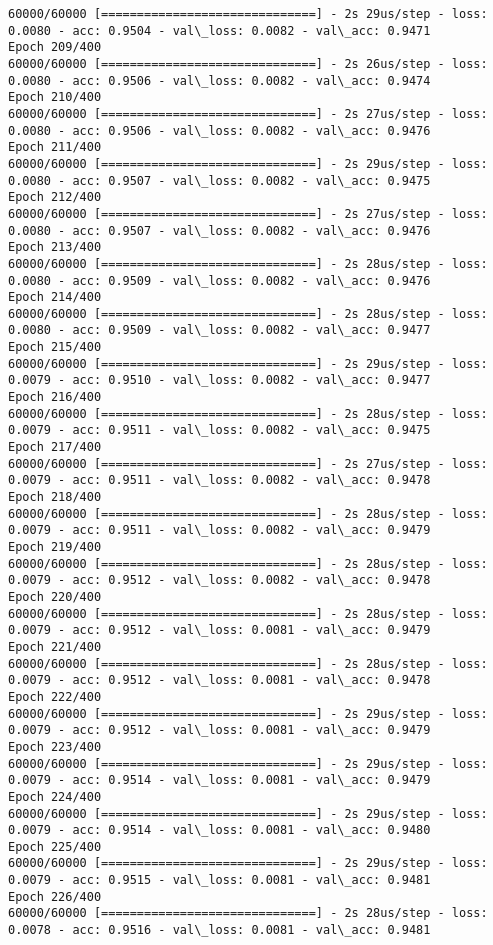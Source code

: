 \documentclass[11pt]{article}
\begin{document}
\begin{Verbatim}[commandchars=\\\{\}]
60000/60000 [==============================] - 2s 29us/step - loss: 0.0080 - acc: 0.9504 - val\_loss: 0.0082 - val\_acc: 0.9471
Epoch 209/400
60000/60000 [==============================] - 2s 26us/step - loss: 0.0080 - acc: 0.9506 - val\_loss: 0.0082 - val\_acc: 0.9474
Epoch 210/400
60000/60000 [==============================] - 2s 27us/step - loss: 0.0080 - acc: 0.9506 - val\_loss: 0.0082 - val\_acc: 0.9476
Epoch 211/400
60000/60000 [==============================] - 2s 29us/step - loss: 0.0080 - acc: 0.9507 - val\_loss: 0.0082 - val\_acc: 0.9475
Epoch 212/400
60000/60000 [==============================] - 2s 27us/step - loss: 0.0080 - acc: 0.9507 - val\_loss: 0.0082 - val\_acc: 0.9476
Epoch 213/400
60000/60000 [==============================] - 2s 28us/step - loss: 0.0080 - acc: 0.9509 - val\_loss: 0.0082 - val\_acc: 0.9476
Epoch 214/400
60000/60000 [==============================] - 2s 28us/step - loss: 0.0080 - acc: 0.9509 - val\_loss: 0.0082 - val\_acc: 0.9477
Epoch 215/400
60000/60000 [==============================] - 2s 29us/step - loss: 0.0079 - acc: 0.9510 - val\_loss: 0.0082 - val\_acc: 0.9477
Epoch 216/400
60000/60000 [==============================] - 2s 28us/step - loss: 0.0079 - acc: 0.9511 - val\_loss: 0.0082 - val\_acc: 0.9475
Epoch 217/400
60000/60000 [==============================] - 2s 27us/step - loss: 0.0079 - acc: 0.9511 - val\_loss: 0.0082 - val\_acc: 0.9478
Epoch 218/400
60000/60000 [==============================] - 2s 28us/step - loss: 0.0079 - acc: 0.9511 - val\_loss: 0.0082 - val\_acc: 0.9479
Epoch 219/400
60000/60000 [==============================] - 2s 28us/step - loss: 0.0079 - acc: 0.9512 - val\_loss: 0.0082 - val\_acc: 0.9478
Epoch 220/400
60000/60000 [==============================] - 2s 28us/step - loss: 0.0079 - acc: 0.9512 - val\_loss: 0.0081 - val\_acc: 0.9479
Epoch 221/400
60000/60000 [==============================] - 2s 28us/step - loss: 0.0079 - acc: 0.9512 - val\_loss: 0.0081 - val\_acc: 0.9478
Epoch 222/400
60000/60000 [==============================] - 2s 29us/step - loss: 0.0079 - acc: 0.9512 - val\_loss: 0.0081 - val\_acc: 0.9479
Epoch 223/400
60000/60000 [==============================] - 2s 29us/step - loss: 0.0079 - acc: 0.9514 - val\_loss: 0.0081 - val\_acc: 0.9479
Epoch 224/400
60000/60000 [==============================] - 2s 29us/step - loss: 0.0079 - acc: 0.9514 - val\_loss: 0.0081 - val\_acc: 0.9480
Epoch 225/400
60000/60000 [==============================] - 2s 29us/step - loss: 0.0079 - acc: 0.9515 - val\_loss: 0.0081 - val\_acc: 0.9481
Epoch 226/400
60000/60000 [==============================] - 2s 28us/step - loss: 0.0078 - acc: 0.9516 - val\_loss: 0.0081 - val\_acc: 0.9481

\end{Verbatim}
\end{document}
